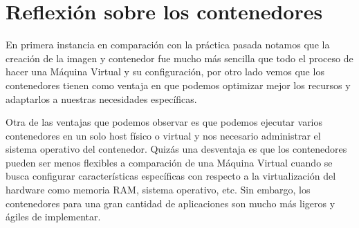 \documentclass[12pt,a4paper]{article}
\begin{document}
\section{Reflexión sobre los contenedores}

En primera instancia en comparación con la práctica pasada notamos que la creación de la imagen y contenedor fue mucho más sencilla que todo el proceso de hacer una Máquina Virtual y su configuración, por otro lado vemos que los contenedores tienen como ventaja en que podemos optimizar mejor los recursos y adaptarlos a nuestras necesidades específicas.

\vspace{1em}

Otra de las ventajas que podemos observar es que podemos ejecutar varios contenedores en un solo host físico o virtual y nos necesario administrar el sistema operativo del contenedor. Quizás una desventaja es que los contenedores pueden ser menos flexibles a comparación de una Máquina Virtual cuando se busca configurar características específicas con respecto a la virtualización del hardware como memoria RAM, sistema operativo, etc. Sin embargo, los contenedores para una gran cantidad de aplicaciones son mucho más ligeros y ágiles de implementar.
\end{document}
